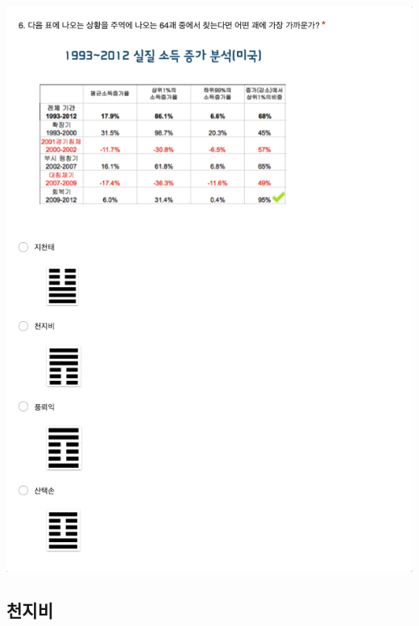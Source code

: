 \documentclass[
]{book}
\begin{document}
\includegraphics[width=0.75\linewidth]{./pics/Quiz230503_Q6}

\subsection{천지비}\label{uxcc9cuxc9c0uxbe44}
\end{document}
